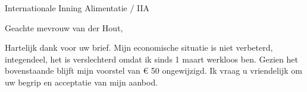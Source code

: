\documentclass{brief}      %
\begin{document}
 
 
 
 
 
 
\begin{brief}{Internationale Inning Alimentatie / IIA }
 
\betreft{}
\opening{Geachte mevrouw van der Hout,}
 
Hartelijk dank voor uw brief. Mijn economische situatie is niet verbeterd, integendeel, het is verslechterd omdat ik sinds 1 maart werkloos ben.
Gezien het bovenstaande blijft mijn voorstel van € 50 ongewijzigd. Ik vraag u vriendelijk om uw begrip en acceptatie van mijn aanbod.

 
\ondertekening{}



 
 
\end{brief}
 
\end{document}
